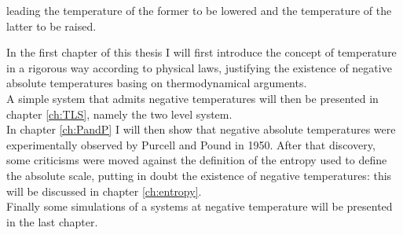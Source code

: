leading the temperature of the former to be lowered and the temperature of the latter to be raised. \par
\vspace{10pt}
In the first chapter of this thesis I will first introduce the concept of temperature in a rigorous way according to physical laws, justifying the existence of negative absolute temperatures basing on thermodynamical arguments. \\
A simple system that admits negative temperatures will then be presented in chapter \ref{ch:TLS}, namely the two level system. \\
In chapter \ref{ch:PandP} I will then show that negative absolute temperatures were experimentally observed by Purcell and Pound in 1950. 
After that discovery, some criticisms were moved against the definition of the entropy used to define the absolute scale, putting in doubt the existence of negative temperatures: this will be discussed in chapter \ref{ch:entropy}. \\
Finally some simulations of a systems at negative temperature will be presented in the last chapter.